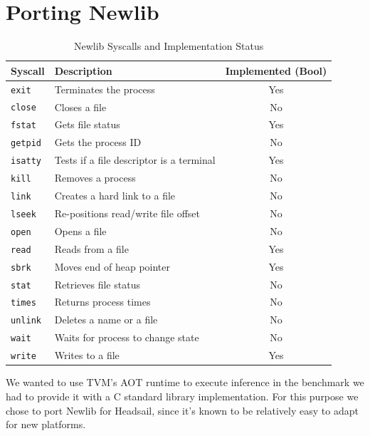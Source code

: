 \documentclass[12pt,a4paper,english
]{tunithesis}
\begin{document}
\section{Porting Newlib}
\label{sec:newlib}

\begin{table}[]
\centering
\begin{tabular}{|l|l|c|}
\hline
\textbf{Syscall}       & \textbf{Description}               & \textbf{Implemented (Bool)} \\ \hline
\texttt{exit}         & Terminates the process             & Yes                       \\ \hline
\texttt{close}         & Closes a file                      & No                       \\ \hline
\texttt{fstat}         & Gets file status                   & Yes                       \\ \hline
\texttt{getpid}        & Gets the process ID                & No                       \\ \hline
\texttt{isatty}        & Tests if a file descriptor is a terminal & Yes                 \\ \hline
\texttt{kill}          & Removes a process                    & No                       \\ \hline
\texttt{link}          & Creates a hard link to a file      & No                       \\ \hline
\texttt{lseek}         & Re-positions read/write file offset & No                       \\ \hline
\texttt{open}          & Opens a file                       & No                       \\ \hline
\texttt{read}          & Reads from a file                  & Yes                       \\ \hline
\texttt{sbrk}          & Moves end of heap pointer          & Yes                       \\ \hline
\texttt{stat}          & Retrieves file status              & No                       \\ \hline
\texttt{times}         & Returns process times              & No                       \\ \hline
\texttt{unlink}        & Deletes a name or a file           & No                       \\ \hline
\texttt{wait}          & Waits for process to change state  & No                       \\ \hline
\texttt{write}         & Writes to a file                   & Yes                       \\ \hline
\end{tabular}
\caption{Newlib Syscalls and Implementation Status}
\label{tab:newlib_syscalls}
\end{table}
We wanted to use TVM's AOT runtime to execute inference in the benchmark we had to provide it with a C standard library implementation. For this purpose we chose to port Newlib for Headsail, since it's known to be relatively easy to adapt for new platforms.
\end{document}
